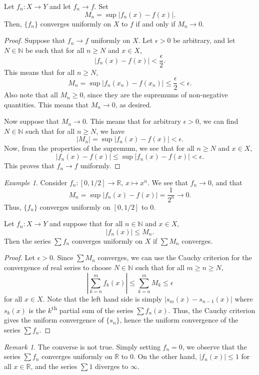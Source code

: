 \documentclass[11pt]{article}
\def\R{\mathbb{R}}
\def\N{\mathbb{N}}
\theoremstyle{definition}
\theoremstyle{remark}
\newtheorem*{remark}{Remark}
\newtheorem*{example}{Example}
\numberwithin{equation}{module}
\begin{document}
    \begin{theorem}
        Let $f_n\colon X \to Y$ and let $f_n \to f$. Set \[
            M_n = \sup |f_n(x) - f(x)|.
        \]
        Then, $\{f_n\}$ converges uniformly on $X$ to $f$ if and only if $M_n \to
        0$.
    \end{theorem}
    \begin{proof}
        Suppose that $f_n \to f$ uniformly on $X$.
        Let $\epsilon > 0$ be arbitrary, and let $N \in \N$ be such that
        for all $n \geq N$ and $x \in X$, \[
            |f_n(x) - f(x)| < \frac{\epsilon}{2}.
        \]
        This means that for all $n \geq N$, \[
            M_n = \sup |f_n(x_n) - f(x_n)| \leq \frac{\epsilon}{2} < \epsilon.
        \]
        Also note that all $M_n \geq 0$, since they are the supremums of non-negative
        quantities.
        This means that $M_n \to 0$, as desired.

        Now suppose that $M_n \to 0$. This means that for arbitrary $\epsilon > 0$,
        we can find $N \in \N$ such that for all $n \geq N$, we have \[
            |M_n| = \sup |f_n(x) - f(x)| < \epsilon.
        \] 
        Now, from the properties of the supremum, we see that for all $n \geq N$ and
        $x \in X$, \[
            |f_n(x) - f(x)| \leq \sup |f_n(x) - f(x)| < \epsilon.
        \] 
        This proves that $f_n \to f$ uniformly.
    \end{proof} 
    \begin{example}
        Consider $f_n\colon [0, 1 /2] \to \R$, $x \mapsto x^n$. We see that $f_n \to
        0$, and that \[
            M_n = \sup|f_n(x) - f(x)| = \frac{1}{2^n} \to 0.
        \] 
        Thus, $\{f_n\}$ converges uniformly on $[0, 1 /2]$ to $0$.
    \end{example}

    \begin{theorem}
        Let $f_n\colon X \to Y$ and suppose that for all $n \in \N$ and $x \in X$,
        \[
            |f_n(x)| \leq M_n.
        \]
        Then the series $\sum f_n$ converges uniformly on $X$ if $\sum M_n$
        converges.
    \end{theorem}
    \begin{proof}
        Let $\epsilon > 0$. Since $\sum M_n$ converges, we can use the Cauchy
        criterion for the convergence of real series to choose $N \in \N$ such that
        for all $m \geq n \geq N$, \[
            \left|\sum_{k = n}^m f_k(x)\right| \leq \sum_{k = n}^m M_k \leq \epsilon
        \] for all $x \in X$.
        Note that the left hand side is simply $|s_m(x) - s_{n - 1}(x)|$ where
        $s_k(x)$ is the $k$\textsuperscript{th} partial sum of the series $\sum
        f_n(x)$. Thus, the Cauchy criterion gives the uniform convergence of 
        $\{s_n\}$, hence the uniform convergence of the series $\sum f_n$.
    \end{proof}
    \begin{remark}
        The converse is not true. Simply setting $f_n = 0$, we observe that the
        series $\sum f_n$ converges uniformly on $\R$ to $0$. On the other hand,
        $|f_n(x)| \leq 1$ for all $x \in \R$, and the series $\sum 1$ diverges to
        $\infty$.
    \end{remark}
    
\end{document}
